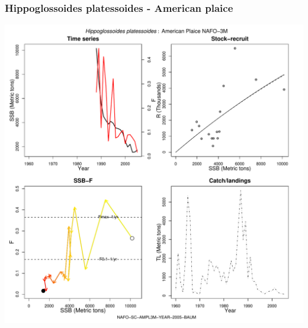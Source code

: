 \subsubsection{Hippoglossoides platessoides - American plaice}
\begin{center}
\includegraphics[width=1.2\textwidth]{../R/figures/NAFO-SC-AMPL3M-YEAR-2005-BAUM.pdf}
\end{center}

